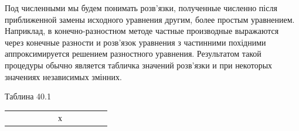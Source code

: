\documentclass[
  ukrainian,
]{article}
\newcounter{none} %
\begin{document}
Под численными мы будем понимать розв'язки, полученные численно після
приближенной замены исходного уравнения другим, более простым
уравнением. Наприклад, в конечно-разностном методе частные производные
выражаются через конечные разности и розв'язок уравнения з частинними
похідними аппроксимируется решением разностного уравнения. Результатом
такой процедуры обычно является табличка значений розв'язки и при
некоторых значениях независимых змінних.

Таблина 40.1

{\def\LTcaptype{none} %
\begin{longtable}[]{@{}
  >{\raggedright\arraybackslash}p{}
  >{\raggedright\arraybackslash}p{}
  >{\raggedright\arraybackslash}p{}
  >{\raggedright\arraybackslash}p{}
  >{\raggedright\arraybackslash}p{}
  >{\raggedright\arraybackslash}p{}
  >{\raggedright\arraybackslash}p{}
  >{\raggedright\arraybackslash}p{}
  >{\raggedright\arraybackslash}p{}
  >{\raggedright\arraybackslash}p{}
  >{\raggedright\arraybackslash}p{}
  >{\raggedright\arraybackslash}p{}@{}}
\toprule\noalign{}
\begin{minipage}[b]{\linewidth}\raggedright
\end{minipage} & \begin{minipage}[b]{\linewidth}\raggedright
\end{minipage} & \begin{minipage}[b]{\linewidth}\raggedright
\end{minipage} & \begin{minipage}[b]{\linewidth}\raggedright
\end{minipage} & \begin{minipage}[b]{\linewidth}\raggedright
\end{minipage} & \begin{minipage}[b]{\linewidth}\raggedright
\end{minipage} & \begin{minipage}[b]{\linewidth}\raggedright
х
\end{minipage} & \begin{minipage}[b]{\linewidth}\raggedright

\end{minipage}
\end{longtable}}
\end{document}

